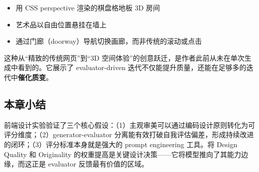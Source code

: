 \begin{itemize}[leftmargin=1.5em]
    \item 用 CSS perspective 渲染的棋盘格地板 3D 房间
    \item 艺术品以自由位置悬挂在墙上
    \item 通过门廊（doorway）导航切换画廊，而非传统的滚动或点击
\end{itemize}

这种从``精致的传统网页''到``3D 空间体验''的创意跃迁，是作者此前从未在单次生成中看到的。它展示了 evaluator-driven 迭代不仅能提升质量，还能在足够多的迭代中\textbf{催化质变}。

\subsection{本章小结}

前端设计实验验证了三个核心假设：（1）主观审美可以通过编码设计原则转化为可评分维度；（2）generator-evaluator 分离能有效打破自我评估偏差，形成持续改进的闭环；（3）评分标准本身就是强大的 prompt engineering 工具。将 Design Quality 和 Originality 的权重提高是关键设计决策——它将模型推向了其能力边缘，而这正是 evaluator 反馈最有价值的区域。


